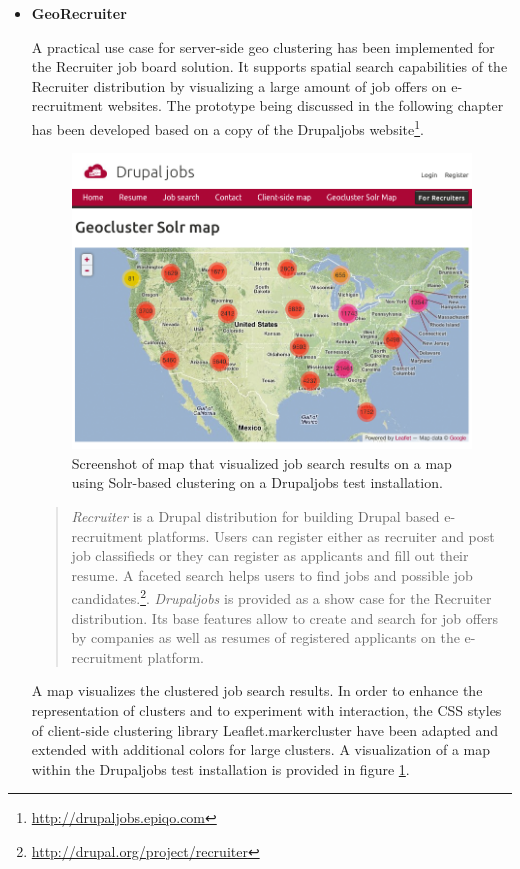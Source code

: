 \begin{itemize}
\item \textbf{GeoRecruiter}

A practical use case for server-side geo clustering has been implemented for the Recruiter job board solution. It supports spatial search capabilities of the Recruiter distribution by visualizing a large amount of job offers on e-recruitment websites. The prototype being discussed in the following chapter has been developed based on a copy of the Drupaljobs website\footnote{\url{http://drupaljobs.epiqo.com}}.

\begin{figure}[h]
  \begin{center}
    \includegraphics[width=1\textwidth]{figures/drupaljobs_geocluster_solr.png}
    \caption{Screenshot of map that visualized job search results on a map using Solr-based clustering on a Drupaljobs test installation.}
    \label{fig:drupaljobs-geocluster-solr}
  \end{center}
\end{figure}

\begin{quote}
\textit{Recruiter} is a Drupal distribution for building Drupal based e-recruitment platforms. Users can register either as recruiter and post job classifieds or they can register as applicants and fill out their resume. A faceted search helps users to find jobs and possible job candidates.\footnote{\url{http://drupal.org/project/recruiter}}. \textit{Drupaljobs} is provided as a show case for the Recruiter distribution. Its base features allow to create and search for job offers by companies as well as resumes of registered applicants on the e-recruitment platform.
\end{quote}

A map visualizes the clustered job search results. In order to enhance the representation of clusters and to experiment with interaction, the CSS styles of client-side clustering library Leaflet.markercluster have been adapted and extended with additional colors for large clusters. A visualization of a map within the Drupaljobs test installation is provided in figure \ref{fig:drupaljobs-geocluster-solr}.

\end{itemize}

